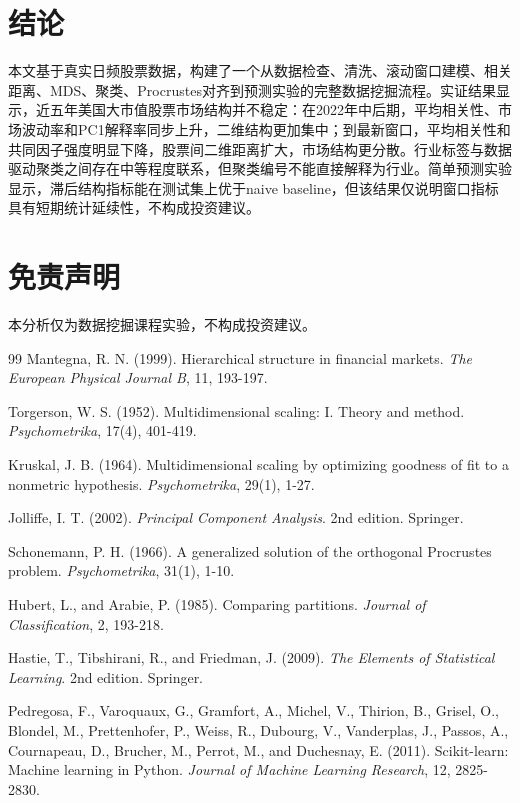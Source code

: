 \documentclass[UTF8,zihao=-4]{ctexart}
\begin{document}
\section{结论}
本文基于真实日频股票数据，构建了一个从数据检查、清洗、滚动窗口建模、相关距离、MDS、聚类、Procrustes对齐到预测实验的完整数据挖掘流程。实证结果显示，近五年美国大市值股票市场结构并不稳定：在2022年中后期，平均相关性、市场波动率和PC1解释率同步上升，二维结构更加集中；到最新窗口，平均相关性和共同因子强度明显下降，股票间二维距离扩大，市场结构更分散。行业标签与数据驱动聚类之间存在中等程度联系，但聚类编号不能直接解释为行业。简单预测实验显示，滞后结构指标能在测试集上优于naive baseline，但该结果仅说明窗口指标具有短期统计延续性，不构成投资建议。

\section*{免责声明}
本分析仅为数据挖掘课程实验，不构成投资建议。

\begin{thebibliography}{99}
Mantegna, R. N. (1999). Hierarchical structure in financial markets. \textit{The European Physical Journal B}, 11, 193-197.

Torgerson, W. S. (1952). Multidimensional scaling: I. Theory and method. \textit{Psychometrika}, 17(4), 401-419.

Kruskal, J. B. (1964). Multidimensional scaling by optimizing goodness of fit to a nonmetric hypothesis. \textit{Psychometrika}, 29(1), 1-27.

Jolliffe, I. T. (2002). \textit{Principal Component Analysis}. 2nd edition. Springer.

Schonemann, P. H. (1966). A generalized solution of the orthogonal Procrustes problem. \textit{Psychometrika}, 31(1), 1-10.

Hubert, L., and Arabie, P. (1985). Comparing partitions. \textit{Journal of Classification}, 2, 193-218.

Hastie, T., Tibshirani, R., and Friedman, J. (2009). \textit{The Elements of Statistical Learning}. 2nd edition. Springer.

Pedregosa, F., Varoquaux, G., Gramfort, A., Michel, V., Thirion, B., Grisel, O., Blondel, M., Prettenhofer, P., Weiss, R., Dubourg, V., Vanderplas, J., Passos, A., Cournapeau, D., Brucher, M., Perrot, M., and Duchesnay, E. (2011). Scikit-learn: Machine learning in Python. \textit{Journal of Machine Learning Research}, 12, 2825-2830.
\end{thebibliography}
\end{document}
